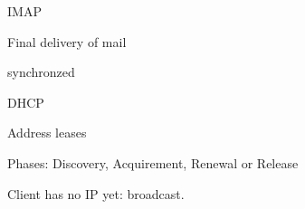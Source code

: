 \documentclass[main.tex]{subfiles}
\begin{document}
\begin{card}{IMAP}
\item Final delivery of mail
\item synchronzed
\end{card}

\begin{card}{DHCP}
\item Address leases
\item Phases: Discovery, Acquirement, Renewal or Release
\item Client has no IP yet: broadcast.
\end{card}

\end{document}
